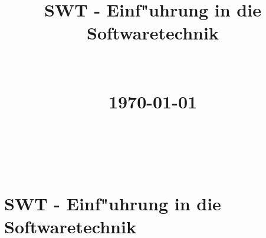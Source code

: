 
\hypersetup{
    citecolor=black,
    filecolor=black,
    linkcolor=black,
    urlcolor=black
}


\title{ \normalsize
		\HRule{0.5pt} \\
		\LARGE \textbf{\uppercase{\newCommandDiscipline}} \\
    \smallbreak
    \small\textbf{{SWT - Einf"uhrung in die Softwaretechnik}}\\
		\HRule{2pt} \\ [0.5cm]
    \small\textbf{{\newCommandTerm}}\\
    [0.5cm]
    \normalsize \today \vspace*{10\baselineskip}}

\date{}



\author{
    \newCommandName \\
		\newCommandMatriculationNumber \\
		\newCommandUniversity \\
		\newCommandFaculty
}


\maketitle
\thispagestyle{empty}

\newpage


\tableofcontents
\listoffigures
\newpage



\sectionfont{\scshape}


\section{SWT - Einf"uhrung in die Softwaretechnik}


